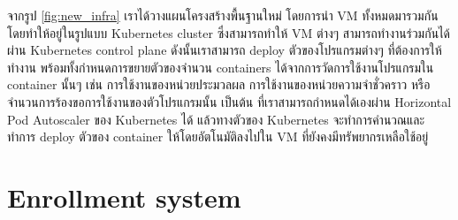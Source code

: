 จากรูป \ref{fig:new_infra} เราได้วางแผนโครงสร้างพื้นฐานใหม่ โดยการนำ VM ทั้งหมดมารวมกันโดยทำให้อยู่ในรูปแบบ Kubernetes cluster ซึ่งสามารถทำให้ VM ต่างๆ สามารถทำงานร่วมกันได้ผ่าน Kubernetes control plane \cite{kubecomp} ดังนั้นเราสามารถ deploy ตัวของโปรแกรมต่างๆ ที่ต้องการให้ทำงาน พร้อมทั้งกำหนดการขยายตัวของจำนวน containers ได้จากการวัดการใช้งานโปรแกรมใน container นั้นๆ เช่น การใช้งานของหน่วยประมวลผล การใช้งานของหน่วยความจำชั่วคราว หรือจำนวนการร้องขอการใช้งานของตัวโปรแกรมนั้น เป็นต้น ที่เราสามารถกำหนดได้เองผ่าน Horizontal Pod Autoscaler \cite{kubehpa} ของ Kubernetes ได้ แล้วทางตัวของ Kubernetes จะทำการคำนวณและทำการ deploy ตัวของ container ให้โดยอัตโนมัติลงไปใน VM ที่ยังคงมีทรัพยากรเหลือใช้อยู่

\section {Enrollment system}

